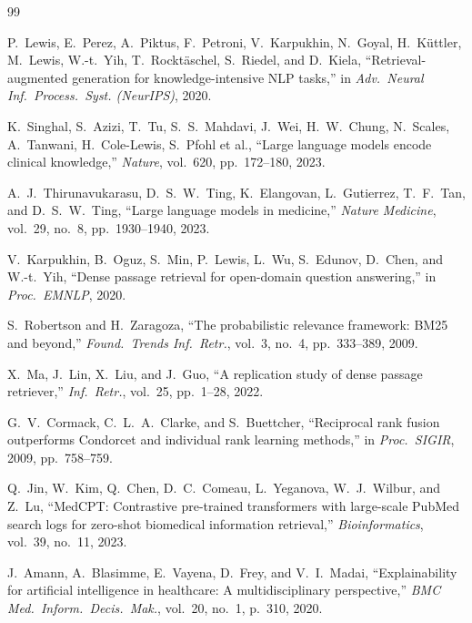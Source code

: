 \documentclass[conference,a4paper]{IEEEtran}
\begin{document}
\balance
\begin{thebibliography}{99}

P.\ Lewis, E.\ Perez, A.\ Piktus, F.\ Petroni, V.\ Karpukhin,
N.\ Goyal, H.\ K{\"u}ttler, M.\ Lewis, W.-t.\ Yih, T.\ Rockt{\"a}schel,
S.\ Riedel, and D.\ Kiela,
``Retrieval-augmented generation for knowledge-intensive NLP tasks,''
in \emph{Adv.\ Neural Inf.\ Process.\ Syst. (NeurIPS)}, 2020.

K.\ Singhal, S.\ Azizi, T.\ Tu, S.\ S.\ Mahdavi, J.\ Wei,
H.\ W.\ Chung, N.\ Scales, A.\ Tanwani, H.\ Cole-Lewis, S.\ Pfohl
et al.,
``Large language models encode clinical knowledge,''
\emph{Nature}, vol.\ 620, pp.\ 172--180, 2023.

A.\ J.\ Thirunavukarasu, D.\ S.\ W.\ Ting, K.\ Elangovan,
L.\ Gutierrez, T.\ F.\ Tan, and D.\ S.\ W.\ Ting,
``Large language models in medicine,''
\emph{Nature Medicine}, vol.\ 29, no.\ 8, pp.\ 1930--1940, 2023.

V.\ Karpukhin, B.\ Oguz, S.\ Min, P.\ Lewis, L.\ Wu, S.\ Edunov,
D.\ Chen, and W.-t.\ Yih,
``Dense passage retrieval for open-domain question answering,''
in \emph{Proc.\ EMNLP}, 2020.

S.\ Robertson and H.\ Zaragoza,
``The probabilistic relevance framework: BM25 and beyond,''
\emph{Found.\ Trends Inf.\ Retr.}, vol.\ 3, no.\ 4, pp.\ 333--389, 2009.

X.\ Ma, J.\ Lin, X.\ Liu, and J.\ Guo,
``A replication study of dense passage retriever,''
\emph{Inf.\ Retr.}, vol.\ 25, pp.\ 1--28, 2022.

G.\ V.\ Cormack, C.\ L.\ A.\ Clarke, and S.\ Buettcher,
``Reciprocal rank fusion outperforms Condorcet and individual rank learning
methods,''
in \emph{Proc.\ SIGIR}, 2009, pp.\ 758--759.

Q.\ Jin, W.\ Kim, Q.\ Chen, D.\ C.\ Comeau, L.\ Yeganova,
W.\ J.\ Wilbur, and Z.\ Lu,
``MedCPT: Contrastive pre-trained transformers with large-scale PubMed
search logs for zero-shot biomedical information retrieval,''
\emph{Bioinformatics}, vol.\ 39, no.\ 11, 2023.

J.\ Amann, A.\ Blasimme, E.\ Vayena, D.\ Frey, and V.\ I.\ Madai,
``Explainability for artificial intelligence in healthcare: A
multidisciplinary perspective,''
\emph{BMC Med.\ Inform.\ Decis.\ Mak.}, vol.\ 20, no.\ 1, p.\ 310, 2020.


\end{thebibliography}
\end{document}
